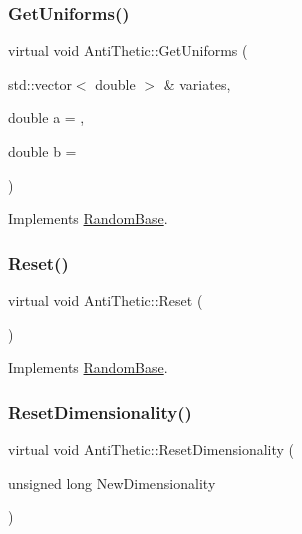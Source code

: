 \subsubsection{\texorpdfstring{Get\+Uniforms()}{GetUniforms()}\hspace{0.1cm}{\footnotesize\ttfamily [2/2]}}
{\footnotesize\ttfamily virtual void Anti\+Thetic\+::\+Get\+Uniforms (\begin{DoxyParamCaption}\item[{std\+::vector$<$ double $>$ \&}]{variates,  }\item[{double}]{a = {},  }\item[{double}]{b = {} }\end{DoxyParamCaption})\hspace{0.3cm}{\ttfamily [virtual]}}



Implements \hyperlink{classRandomBase_a3bbf85695dbb1a9462a2b6c3f10af969}{Random\+Base}.

\hypertarget{classAntiThetic_a54f6452f0017f86580b7af9dfa0172e4}{}\label{classAntiThetic_a54f6452f0017f86580b7af9dfa0172e4} 
\subsubsection{\texorpdfstring{Reset()}{Reset()}}
{\footnotesize\ttfamily virtual void Anti\+Thetic\+::\+Reset (\begin{DoxyParamCaption}{ }\end{DoxyParamCaption})\hspace{0.3cm}{\ttfamily [virtual]}}



Implements \hyperlink{classRandomBase_a6e35c1467b37fc8c5e262297223685eb}{Random\+Base}.

\hypertarget{classAntiThetic_afb5d6c15a5729be709d905d81582e1b7}{}\label{classAntiThetic_afb5d6c15a5729be709d905d81582e1b7} 
\subsubsection{\texorpdfstring{Reset\+Dimensionality()}{ResetDimensionality()}}
{\footnotesize\ttfamily virtual void Anti\+Thetic\+::\+Reset\+Dimensionality (\begin{DoxyParamCaption}\item[{unsigned long}]{New\+Dimensionality }\end{DoxyParamCaption})\hspace{0.3cm}{\ttfamily [virtual]}}



